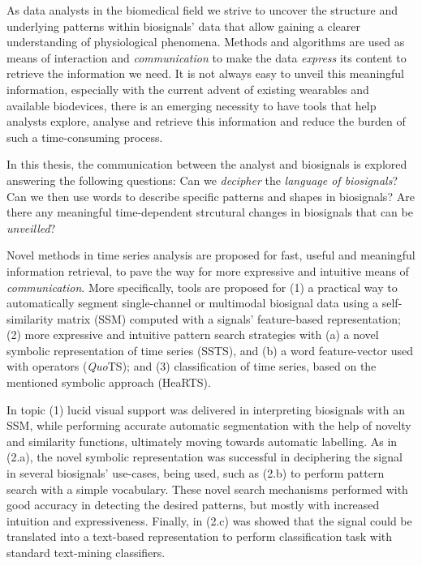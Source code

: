 
%

As data analysts in the biomedical field we strive to uncover the structure and underlying patterns within biosignals' data that allow gaining a clearer understanding of physiological phenomena. Methods and algorithms are used as means of interaction and \textit{communication} to make the data \textit{express} its content to retrieve the information we need. It is not always easy to unveil this meaningful information, especially with the current advent of existing wearables and available biodevices, there is an emerging necessity to have tools that help analysts explore, analyse and retrieve this information and reduce the burden of such a time-consuming process. 

In this thesis, the communication between the analyst and biosignals is explored answering the following questions: Can we \textit{decipher} the \textit{language of biosignals}? Can we then use words to describe specific patterns and shapes in biosignals? Are there any meaningful time-dependent strcutural changes in biosignals that can be \textit{unveilled}? 

Novel methods in time series analysis are proposed for fast, useful and meaningful information retrieval, to pave the way for more expressive and intuitive means of \textit{communication}. More specifically, tools are proposed for (1) a practical way to automatically segment single-channel or multimodal biosignal data using a self-similarity matrix (SSM) computed with a signals' feature-based representation; (2) more expressive and intuitive pattern search strategies with (a) a novel symbolic representation of time series (SSTS), and (b) a word feature-vector used with operators (\textit{Quo}TS); and (3) classification of time series, based on the mentioned symbolic approach (HeaRTS). 

In topic (1) lucid visual support was delivered in interpreting biosignals with an SSM, while performing accurate automatic segmentation with the help of novelty and similarity functions, ultimately moving towards automatic labelling. As in (2.a), the novel symbolic representation was successful in deciphering the signal in several biosignals' use-cases, being used, such as (2.b) to perform pattern search with a simple vocabulary. These novel search mechanisms performed with good accuracy in detecting the desired patterns, but mostly with increased intuition and expressiveness. Finally, in (2.c) was showed that the signal could be translated into a text-based representation to perform classification task with standard text-mining classifiers.


